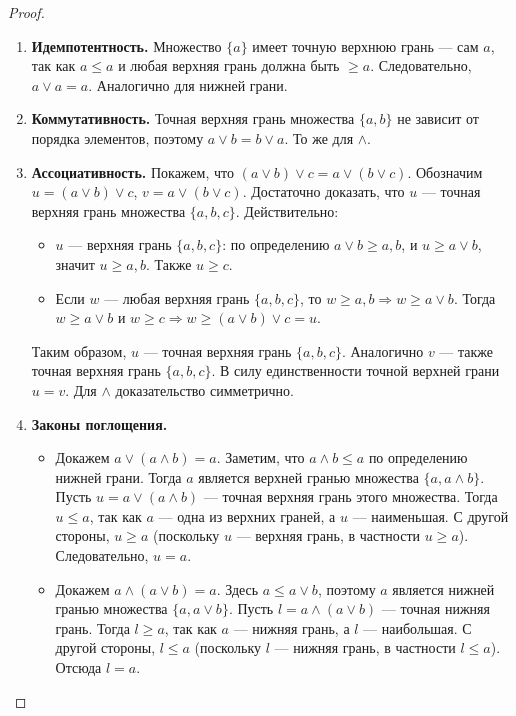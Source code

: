 \documentclass[10pt]{article}
\begin{document}
\begin{proof}
\begin{enumerate}
    \item \textbf{Идемпотентность.} Множество $\{a\}$ имеет точную верхнюю грань — сам $a$, так как $a \le a$ и любая верхняя грань должна быть $\ge a$. Следовательно, $a \vee a = a$. Аналогично для нижней грани.
    \item \textbf{Коммутативность.} Точная верхняя грань множества $\{a,b\}$ не зависит от порядка элементов, поэтому $a \vee b = b \vee a$. То же для $\wedge$.
    \item \textbf{Ассоциативность.} Покажем, что $(a \vee b) \vee c = a \vee (b \vee c)$. Обозначим $u = (a \vee b) \vee c$, $v = a \vee (b \vee c)$. Достаточно доказать, что $u$ — точная верхняя грань множества $\{a,b,c\}$. Действительно:
        \begin{itemize}
            \item $u$ — верхняя грань $\{a,b,c\}$: по определению $a \vee b \ge a, b$, и $u \ge a \vee b$, значит $u \ge a, b$. Также $u \ge c$.
            \item Если $w$ — любая верхняя грань $\{a,b,c\}$, то $w \ge a,b \Rightarrow w \ge a \vee b$. Тогда $w \ge a \vee b$ и $w \ge c \Rightarrow w \ge (a \vee b) \vee c = u$.
        \end{itemize}
        Таким образом, $u$ — точная верхняя грань $\{a,b,c\}$. Аналогично $v$ — также точная верхняя грань $\{a,b,c\}$. В силу единственности точной верхней грани $u = v$. Для $\wedge$ доказательство симметрично.
    \item \textbf{Законы поглощения.}
        \begin{itemize}
            \item Докажем $a \vee (a \wedge b) = a$. Заметим, что $a \wedge b \le a$ по определению нижней грани. Тогда $a$ является верхней гранью множества $\{a, a \wedge b\}$. Пусть $u = a \vee (a \wedge b)$ — точная верхняя грань этого множества. Тогда $u \le a$, так как $a$ — одна из верхних граней, а $u$ — наименьшая. С другой стороны, $u \ge a$ (поскольку $u$ — верхняя грань, в частности $u \ge a$). Следовательно, $u = a$.
            \item Докажем $a \wedge (a \vee b) = a$. Здесь $a \le a \vee b$, поэтому $a$ является нижней гранью множества $\{a, a \vee b\}$. Пусть $l = a \wedge (a \vee b)$ — точная нижняя грань. Тогда $l \ge a$, так как $a$ — нижняя грань, а $l$ — наибольшая. С другой стороны, $l \le a$ (поскольку $l$ — нижняя грань, в частности $l \le a$). Отсюда $l = a$.
        \end{itemize}
\end{enumerate}
\end{proof}
\end{document}

